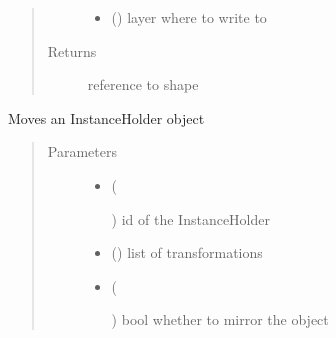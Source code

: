 \documentclass[a4paper,10pt,english]{sphinxmanual}
\begin{document}
\begin{fulllineitems}
\begin{fulllineitems}
\begin{quote}
\begin{description}
\begin{itemize}
\item {} 
 () \textendash{} layer where to write to

\end{itemize}

\item[{Returns}] \leavevmode
reference to shape

\end{description}\end{quote}

\end{fulllineitems}


\begin{fulllineitems}
\label{\detokenize{photonics/photonics:kppc.photonics.PhotDevice.move_instance}}
Moves an InstanceHolder object
\begin{quote}\begin{description}
\item[{Parameters}] \leavevmode\begin{itemize}
\item {} 
 (%
\begin{footnote}[60]\sphinxAtStartFootnote
{}
%
\end{footnote}) \textendash{} id of the InstanceHolder

\item {} 
 () \textendash{} list of transformations

\item {} 
 (%
\begin{footnote}[61]\sphinxAtStartFootnote
{}
%
\end{footnote}) \textendash{} bool whether to mirror the object


\end{itemize}
\end{description}
\end{quote}
\end{fulllineitems}
\end{fulllineitems}
\end{document}
